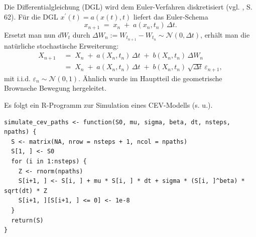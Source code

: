 Die Differentialgleichung (DGL) wird dem Euler-Verfahren diskretisiert (vgl. \cite{iacus2008}, S. 62).
Für die DGL $x^\prime(t)=a(x(t),t)$ liefert das Euler‑Schema
$$
x_{n+1} \;=\; x_n \;+\; a(x_n,t_n)\,\Delta t.
$$
Ersetzt man nun $dW_t$ durch $\Delta W_n:=W_{t_{n+1}}-W_{t_n}\sim \mathcal N(0,\Delta t)$, erhält man die natürliche stochastische Erweiterung:
$$
\begin{aligned}
X_{n+1} \;&=\; X_n \;+\; a(X_n,t_n)\,\Delta t \;+\; b(X_n,t_n)\,\Delta W_n \\
\;&=\; X_n \;+\; a(X_n,t_n)\,\Delta t \;+\; b(X_n,t_n)\,\sqrt{\Delta t}\,\varepsilon_{n+1},
\end{aligned}
$$
mit i.i.d. $\varepsilon_{n}\sim\mathcal N(0,1)$. 
Ähnlich wurde im Hauptteil die geometrische Brownsche Bewegung hergeleitet.

\begin{bsp}[Implementierung]
Es folgt ein R-Programm zur Simulation eines CEV-Modells (s. u.).

\begin{lstlisting}
simulate_cev_paths <- function(S0, mu, sigma, beta, dt, nsteps, npaths) {
  S <- matrix(NA, nrow = nsteps + 1, ncol = npaths)
  S[1, ] <- S0
  for (i in 1:nsteps) {
    Z <- rnorm(npaths)
    S[i+1, ] <- S[i, ] + mu * S[i, ] * dt + sigma * (S[i, ]^beta) * sqrt(dt) * Z
    S[i+1, ][S[i+1, ] <= 0] <- 1e-8
  }
  return(S)
}
\end{lstlisting}

\end{bsp}

